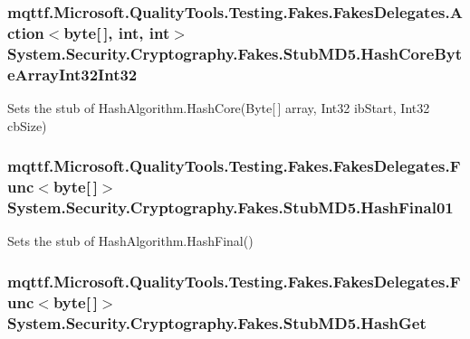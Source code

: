 \hypertarget{class_system_1_1_security_1_1_cryptography_1_1_fakes_1_1_stub_m_d5_a6361a1de2396ac5b6745f50151043d37}{
\subsubsection[{Hash\-Core\-Byte\-Array\-Int32\-Int32}]{\setlength{\rightskip}{0pt plus 5cm}mqttf.\-Microsoft.\-Quality\-Tools.\-Testing.\-Fakes.\-Fakes\-Delegates.\-Action$<$byte\mbox{[}$\,$\mbox{]}, int, int$>$ System.\-Security.\-Cryptography.\-Fakes.\-Stub\-M\-D5.\-Hash\-Core\-Byte\-Array\-Int32\-Int32}}\label{class_system_1_1_security_1_1_cryptography_1_1_fakes_1_1_stub_m_d5_a6361a1de2396ac5b6745f50151043d37}


Sets the stub of Hash\-Algorithm.\-Hash\-Core(\-Byte\mbox{[}$\,$\mbox{]} array, Int32 ib\-Start, Int32 cb\-Size)

\hypertarget{class_system_1_1_security_1_1_cryptography_1_1_fakes_1_1_stub_m_d5_a43aa1344793b7350d0903a31f0f3432b}{
\subsubsection[{Hash\-Final01}]{\setlength{\rightskip}{0pt plus 5cm}mqttf.\-Microsoft.\-Quality\-Tools.\-Testing.\-Fakes.\-Fakes\-Delegates.\-Func$<$byte\mbox{[}$\,$\mbox{]}$>$ System.\-Security.\-Cryptography.\-Fakes.\-Stub\-M\-D5.\-Hash\-Final01}}\label{class_system_1_1_security_1_1_cryptography_1_1_fakes_1_1_stub_m_d5_a43aa1344793b7350d0903a31f0f3432b}


Sets the stub of Hash\-Algorithm.\-Hash\-Final()

\hypertarget{class_system_1_1_security_1_1_cryptography_1_1_fakes_1_1_stub_m_d5_ae6e85647fa62f4214b88532099346130}{
\subsubsection[{Hash\-Get}]{\setlength{\rightskip}{0pt plus 5cm}mqttf.\-Microsoft.\-Quality\-Tools.\-Testing.\-Fakes.\-Fakes\-Delegates.\-Func$<$byte\mbox{[}$\,$\mbox{]}$>$ System.\-Security.\-Cryptography.\-Fakes.\-Stub\-M\-D5.\-Hash\-Get}}\label{class_system_1_1_security_1_1_cryptography_1_1_fakes_1_1_stub_m_d5_ae6e85647fa62f4214b88532099346130}


